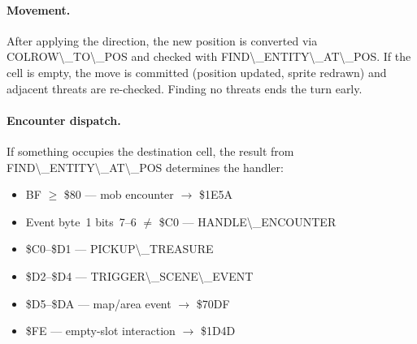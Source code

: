 \documentclass[10pt]{report}
\begin{document}
\paragraph{Movement.}
After applying the direction, the new position is converted via
{\Tt{}COLROW{\textbackslash}{\_}TO{\textbackslash}{\_}POS\nwendquote} and checked with {\Tt{}FIND{\textbackslash}{\_}ENTITY{\textbackslash}{\_}AT{\textbackslash}{\_}POS\nwendquote}.
If the cell is empty, the move is committed (position updated, sprite
redrawn) and adjacent threats are re-checked.  Finding no threats
ends the turn early.

\paragraph{Encounter dispatch.}
If something occupies the destination cell, the result from
{\Tt{}FIND{\textbackslash}{\_}ENTITY{\textbackslash}{\_}AT{\textbackslash}{\_}POS\nwendquote} determines the handler:
\begin{itemize}
\item {\Tt{}{\textbackslash}{\$}BF\nwendquote} $\geq$ \$80 --- mob encounter $\to$ \$1E5A
\item Event byte~1 bits~7--6 $\neq$ \$C0 --- {\Tt{}HANDLE{\textbackslash}{\_}ENCOUNTER\nwendquote}
\item \$C0--\$D1 --- {\Tt{}PICKUP{\textbackslash}{\_}TREASURE\nwendquote}
\item \$D2--\$D4 --- {\Tt{}TRIGGER{\textbackslash}{\_}SCENE{\textbackslash}{\_}EVENT\nwendquote}
\item \$D5--\$DA --- map/area event $\to$ \$70DF
\item \$FE --- empty-slot interaction $\to$ \$1D4D
\end{itemize}
\end{document}
